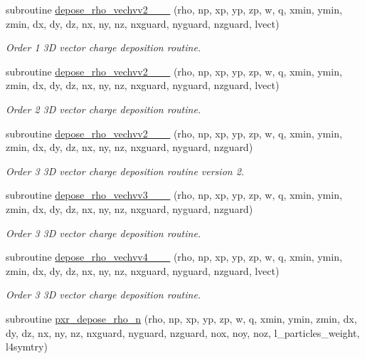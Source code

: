 \begin{DoxyCompactItemize}
\item 
subroutine \hyperlink{charge__deposition_8_f90_a8cd073a8fdaca9986ced5d11280777f6}{depose\+\_\+rho\+\_\+vechvv2\+\_\+\_\+\_} (rho, np, xp, yp, zp, w, q, xmin, ymin, zmin, dx, dy, dz, nx, ny, nz, nxguard, nyguard, nzguard, lvect)
\begin{DoxyCompactList}\small\item\em Order 1 3D vector charge deposition routine. \end{DoxyCompactList}\item 
subroutine \hyperlink{charge__deposition_8_f90_a618d3787267c54578f40d084c4d915e3}{depose\+\_\+rho\+\_\+vechvv2\+\_\+\_\+\_} (rho, np, xp, yp, zp, w, q, xmin, ymin, zmin, dx, dy, dz, nx, ny, nz, nxguard, nyguard, nzguard, lvect)
\begin{DoxyCompactList}\small\item\em Order 2 3D vector charge deposition routine. \end{DoxyCompactList}\item 
subroutine \hyperlink{charge__deposition_8_f90_a410f5675f18d7fc7da40221984c0f89e}{depose\+\_\+rho\+\_\+vechvv2\+\_\+\_\+\_} (rho, np, xp, yp, zp, w, q, xmin, ymin, zmin, dx, dy, dz, nx, ny, nz, nxguard, nyguard, nzguard)
\begin{DoxyCompactList}\small\item\em Order 3 3D vector charge deposition routine version 2. \end{DoxyCompactList}\item 
subroutine \hyperlink{charge__deposition_8_f90_ac37deeb48a2c970189b6c77f251d2a68}{depose\+\_\+rho\+\_\+vechvv3\+\_\+\_\+\_} (rho, np, xp, yp, zp, w, q, xmin, ymin, zmin, dx, dy, dz, nx, ny, nz, nxguard, nyguard, nzguard)
\begin{DoxyCompactList}\small\item\em Order 3 3D vector charge deposition routine. \end{DoxyCompactList}\item 
subroutine \hyperlink{charge__deposition_8_f90_a55f64905a5f5c387baef1cdddfc060f7}{depose\+\_\+rho\+\_\+vechvv4\+\_\+\_\+\_} (rho, np, xp, yp, zp, w, q, xmin, ymin, zmin, dx, dy, dz, nx, ny, nz, nxguard, nyguard, nzguard, lvect)
\begin{DoxyCompactList}\small\item\em Order 3 3D vector charge deposition routine. \end{DoxyCompactList}\item 
subroutine \hyperlink{charge__deposition_8_f90_a1ba91732b5b34c8c04f7570c8df67c26}{pxr\+\_\+depose\+\_\+rho\+\_\+n} (rho, np, xp, yp, zp, w, q, xmin, ymin, zmin, dx, dy, dz, nx, ny, nz, nxguard, nyguard, nzguard, nox, noy, noz, l\+\_\+particles\+\_\+weight, l4symtry)

\end{DoxyCompactItemize}
